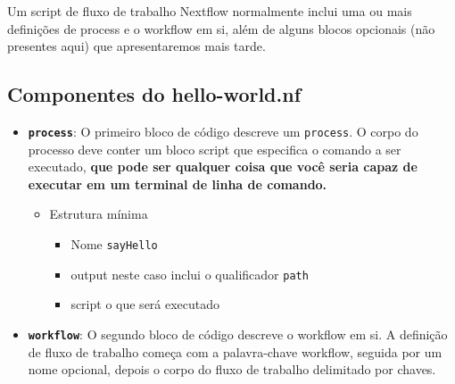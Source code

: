 \documentclass[
  brazilian,
  letterpaper,
  DIV=11,
  numbers=noendperiod]{scrreprt}
\providecommand{\tightlist}{%
  \setlength{\itemsep}{0pt}\setlength{\parskip}{0pt}}
\begin{document}
\begin{tcolorbox}[enhanced jigsaw, arc=.35mm, bottomrule=.15mm, bottomtitle=1mm, breakable, colback=white, colbacktitle=quarto-callout-tip-color!10!white, colframe=quarto-callout-tip-color-frame, coltitle=black, left=2mm, leftrule=.75mm, opacityback=0, opacitybacktitle=0.6, rightrule=.15mm, title=\textcolor{quarto-callout-tip-color}{\faLightbulb}\hspace{0.5em}{Dica}, titlerule=0mm, toprule=.15mm, toptitle=1mm]

Um script de fluxo de trabalho Nextflow normalmente inclui uma ou mais
definições de process e o workflow em si, além de alguns blocos
opcionais (não presentes aqui) que apresentaremos mais tarde.

\end{tcolorbox}

\subsection{Componentes do
hello-world.nf}\label{componentes-do-hello-world.nf}

\begin{itemize}
\tightlist
\item
  \textbf{\texttt{process}}: O primeiro bloco de código descreve um
  \texttt{process}. O corpo do processo deve conter um bloco script que
  especifica o comando a ser executado, \textbf{que pode ser qualquer
  coisa que você seria capaz de executar em um terminal de linha de
  comando.}

  \begin{itemize}
  \tightlist
  \item
    Estrutura mínima

    \begin{itemize}
    \tightlist
    \item
      Nome \texttt{sayHello}
    \item
      output neste caso inclui o qualificador \texttt{path}
    \item
      script o que será executado
    \end{itemize}
  \end{itemize}
\item
  \textbf{\texttt{workflow}}: O segundo bloco de código descreve o
  workflow em si. A definição de fluxo de trabalho começa com a
  palavra-chave workflow, seguida por um nome opcional, depois o corpo
  do fluxo de trabalho delimitado por chaves.
\end{itemize}
\end{document}
